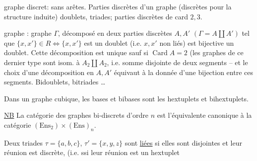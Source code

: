 graphe discret: sans arêtes. Parties discrètes d'un graphe (discrètes pour la structure induite) doublets, triades; parties discrètes de card $2,3$.

 graphe : graphe  $\Gamma$, décomposé en deux parties discrètes
$A,A'$ $(\Gamma=A\amalg A')$  tel que
$\{x,x'\}\in R\Longleftrightarrow\{x,x'\}$ est un doublet (i.e. $x,x'$ non liés) est bijective
 un doublet. Cette décomposition est unique sauf si
$\operatorname{Card} A=2$  (les graphes de ce dernier type sont  isom. à
$A_2\amalg A_2$, i.e. somme disjointe de deux segments -- et le
choix d'une  décomposition  en $A,A'$ équivaut à la donnée d'une bijection entre ces segments.
Bidoublets, bitriades \ldots\ 


Dans un graphe cubique, les bases et bibases
sont les  hextuplets et bihextuplets.


\uline{NB} La catégorie des graphes bi-discrets d'ordre $n$ est
l'équivalente canonique à la catégorie $(\mathrm{Ens}_2)\times(\mathrm{Ens})_n$.

Deux triades $\tau=\{a,b,c\}$, $\tau'=\{x,y,z\}$ sont   \uline{liées}
si  elles sont disjointes et leur réunion
est discrète, (i.e. ssi leur réunion est un hextuplet \unsure{\S} 

